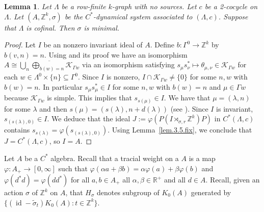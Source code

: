 \documentclass[a4paper, 12pt]{amsart}
\numberwithin{equation}{section}
\newcounter{theorem}
\newtheorem{lemma}[theorem]{Lemma}
\theoremstyle{remark}
\theoremstyle{definition}
\begin{document}
\begin{lemma}\label{lem.minimal}
Let $\Lambda$ be a row-finite $k$-graph with no sources. Let $c$ be a 2-cocycle on
$\Lambda$. Let $(A,{\mathbb{Z}}^k,\sigma)$ be the $C^*$-dynamical system associated to
$(\Lambda, c)$. Suppose that $\Lambda$ is cofinal. Then $\sigma$ is minimal.
\end{lemma}
\begin{proof}
Let $I$ be an nonzero invariant ideal of $A$. Define $b \colon \Gamma^0 \to {\mathbb{Z}}^k$ by
$b(v, n) = n$. Using \cite[Lemma~8.4]{MR3335414} and its proof we have an isomorphism
$A\cong \overline{\bigcup_n \bigoplus_{b(w)=n} {\mathcal{K}}_{\Gamma w}}$ via an isomorphism
satisfying $s_\mu s_\nu^*\mapsto \theta_{\mu,\nu} \in {\mathcal{K}}_{\Gamma w}$ for each $w\in
\Lambda^0\times \{n\}\subseteq \Gamma^0$. Since $I$ is nonzero, $I\cap {\mathcal{K}}_{\Gamma w}\neq
\{0\}$ for some $n,w$ with $b(w)=n$. In particular $s_\mu s_\mu^*\in I$ for some $n,w$
with $b(w)=n$ and $\mu\in \Gamma w$ because ${\mathcal{K}}_{\Gamma w}$ is simple. This implies that
$s_{s(\mu)}\in I$. We have that $\mu=(\lambda,n)$ for some $\lambda$ and then $s(\mu)=
(s(\lambda), n + d(\lambda))$ (see \cite[Definition 5.1]{MR1745529}). Since $I$ is
invariant, $s_{(s(\lambda),0)}\in I$. We deduce that the ideal
$J:=\varphi(P(I\rtimes_{\sigma,r} {\mathbb{Z}}^k)P)$ in $C^*(\Lambda,c)$ contains
$s_{s(\lambda)}=\varphi(s_{(s(\lambda),0)})$. Using Lemma~\ref{lem.3.5.fix}, we conclude
that $J=C^*(\Lambda,c)$, so $I=A$.
\end{proof}

Let $A$ be a $C^*$ algebra. Recall that a tracial weight on a $A$ is a map $\varphi\colon
A_+\to [0,\infty]$ such that $\varphi(\alpha a + \beta b) = \alpha \varphi(a) + \beta
\varphi(b)$ and $\varphi(d^*d) = \varphi(dd^*)$ for all $a,b\in A_+$ all $\alpha,\beta
\in {\mathbb{R}}^+$ and all $d\in A$. Recall, given an action $\sigma$ of ${\mathbb{Z}}^k$ on $A$, that
$H_\sigma$ denotes subgroup of $K_0(A)$ generated by $\{({\operatorname{id}} - \tilde\sigma_t)K_0(A) : t
\in  {\mathbb{Z}}^k\}$.
\end{document}
